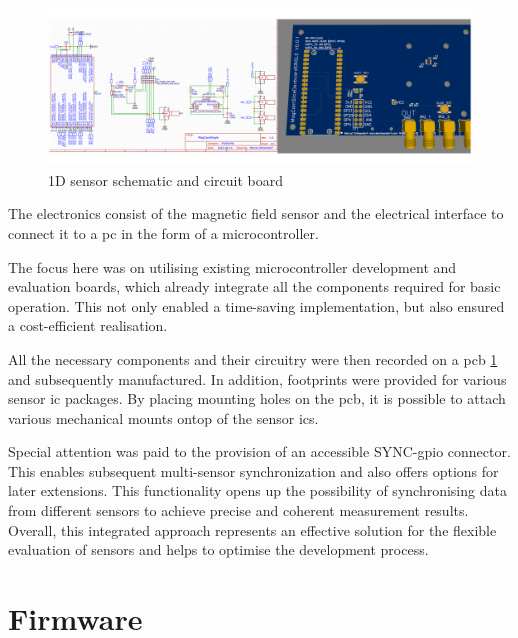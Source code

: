 \begin{figure}
\centering
\includegraphics{./generated_images/border_1D_sensor_schematic_and_circuit_board.png}
\caption{1D sensor schematic and circuit board
\label{1D_sensor_schematic_and_circuit_board.png}}
\end{figure}

The electronics consist of the magnetic field sensor and the electrical
interface to connect it to a \gls{pc} in the form of a microcontroller.

The focus here was on utilising existing microcontroller development and
evaluation boards, which already integrate all the components required
for basic operation. This not only enabled a time-saving implementation,
but also ensured a cost-efficient realisation.

All the necessary components and their circuitry were then recorded on a
\gls{pcb} \ref{1D_sensor_schematic_and_circuit_board.png} and
subsequently manufactured. In addition, footprints were provided for
various sensor \gls{ic} packages. By placing mounting holes on the
\gls{pcb}, it is possible to attach various mechanical mounts ontop of
the sensor \gls{ic}s.

Special attention was paid to the provision of an accessible
SYNC-\gls{gpio} connector. This enables subsequent multi-sensor
synchronization and also offers options for later extensions. This
functionality opens up the possibility of synchronising data from
different sensors to achieve precise and coherent measurement results.
Overall, this integrated approach represents an effective solution for
the flexible evaluation of sensors and helps to optimise the development
process.

\hypertarget{firmware}{%
\section{Firmware}\label{firmware}}

